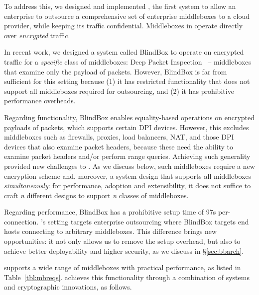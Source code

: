 To address this, we designed and implemented \sys, the first system to allow an enterprise to outsource  a comprehensive set of enterprise middleboxes  to a cloud provider, while keeping its traffic confidential. 
Middleboxes in \sys operate directly over {\it encrypted} traffic. %


In recent work, we designed a system called BlindBox to operate on encrypted traffic for a {\em specific} class of middleboxes: Deep Packet Inspection~\cite{blindbox} -- middleboxes that examine only the payload of packets. 
However, BlindBox is far from sufficient for this setting because
 (1) it has restricted functionality that does not support all middleboxes required for outsourcing, and (2) it has prohibitive performance overheads.
 
 Regarding functionality, BlindBox enables equality-based operations on  encrypted payloads of packets, which supports certain DPI devices. However, this excludes middleboxes such as firewalls, proxies, load balancers, NAT,  and those DPI devices that also examine packet headers, because these need the ability to examine packet headers and/or perform range queries. 
 Achieving such generality provided new challenges to \sys. 
As we discuss below, such middleboxes require a new encryption scheme and, moreover, a system design that supports all middleboxes {\it simultaneously}: for performance, adoption and extensibility, it does not suffice to craft {\it n} different designs to support {\it n} classes of middleboxes. 

 
Regarding performance, BlindBox has a prohibitive setup time of 97s per-connection. 
\sys's setting targets enterprise outsourcing where BlindBox targets end hosts connecting to arbitrary middleboxes. This difference brings \sys new opportunities: it
not only allows us to remove the setup overhead, but also to achieve better deployability and higher security, as we discuss in \S\ref{sec:bbarch}. 

\sys supports a wide range of middleboxes with practical performance, as listed in Table~\ref{tbl:mbreqs}. 
\sys achieves this functionality through a combination of systems and cryptographic innovations, as follows.
   
